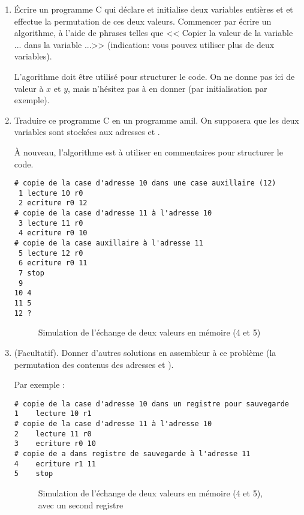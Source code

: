 \begin{enumerate}
\item
  Écrire un programme C qui déclare et initialise deux variables
  entières  et  et effectue la permutation de ces deux
  valeurs. Commencer par écrire un algorithme, à l'aide de phrases
  telles que << Copier la valeur de la variable ... dans la variable
  ...>> (indication: vous pouvez utiliser plus de deux variables).
\begin{correction}
L'agorithme doit être utilisé pour structurer le code. On ne donne pas ici de valeur à $x$ et $y$, mais n'hésitez pas à en donner (par initialisation par exemple).

{\small
{}
}
\end{correction}

\item Traduire ce programme C en un programme amil. On supposera que les deux variables sont stockées aux adresses  et .
  \begin{correction}
    À nouveau, l'algorithme est à utiliser en commentaires pour
      structurer le code.
\begin{verbatim}
# copie de la case d'adresse 10 dans une case auxillaire (12)
 1 lecture 10 r0
 2 ecriture r0 12
# copie de la case d'adresse 11 à l'adresse 10
 3 lecture 11 r0
 4 ecriture r0 10
# copie de la case auxillaire à l'adresse 11
 5 lecture 12 r0
 6 ecriture r0 11
 7 stop
 9
10 4
11 5
12 ?
\end{verbatim}
  \end{correction}
\begin{correction}
 \begin{figure}
  \centering
  
  \caption{Simulation de l'échange de deux valeurs en mémoire (4 et 5)}
  \label{simsw1}
\end{figure}
  \end{correction}
\item (Facultatif). Donner d'autres solutions en assembleur à ce problème (la permutation des contenus des adresses  et ).
  \begin{correction}
Par exemple :
\begin{verbatim}
# copie de la case d'adresse 10 dans un registre pour sauvegarde
1    lecture 10 r1
# copie de la case d'adresse 11 à l'adresse 10
2    lecture 11 r0
3    ecriture r0 10
# copie de a dans registre de sauvegarde à l'adresse 11
4    ecriture r1 11
5    stop
\end{verbatim}
\begin{figure}
  \centering
  
  \caption{Simulation de l'échange de deux valeurs en mémoire (4 et 5), avec un second registre}
  \label{simsw2}
\end{figure}
  \end{correction}


\end{enumerate}
